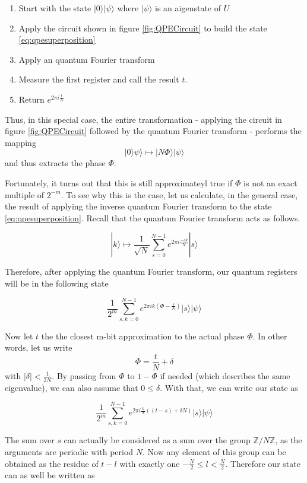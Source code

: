 \documentclass[a4paper, draft]{article}
\theoremstyle{own}
\theoremstyle{remark}
\newcommand{\Z}{\mathbb{Z}}
\begin{document}
\begin{enumerate}
	\item Start with the state  $|0 \rangle |\psi \rangle$ where $|\psi \rangle$ is an aigenstate of $U$
	\item Apply the circuit shown in figure \ref{fig:QPECircuit} to build the state \eqref{eq:qpesuperposition}
	\item Apply an  quantum Fourier transform
	\item Measure the first register and call the result $t$. 
	\item Return $e^{2\pi i \frac{t}{N}}$
\end{enumerate}

Thus, in this special case, the entire transformation - applying the circuit in figure \ref{fig:QPECircuit} followed by the quantum Fourier transform - performs the mapping
$$
|0 \rangle \psi \rangle \mapsto | N \Phi \rangle |\psi \rangle
$$
and thus extracts the phase $\Phi$.

Fortunately, it turns out that this is still approximateyl true if $\Phi$ is not an exact multiple of $2^{-m}$. To see why this is the case, let us calculate, in the general case, the result of applying the inverse quantum Fourier transform to the state \eqref{eq:qpesuperposition}. Recall that the  quantum Fourier transform acts as follows.

$$
|k \rangle \mapsto \frac{1}{\sqrt{N}} \sum_{s=0}^{N-1} e^{2\pi i \frac{-sk}{N}} |s \rangle
$$

Therefore, after applying the  quantum Fourier transform, our quantum registers will be in the following state

$$
\frac{1}{2^m} \sum_{s,k=0}^{N-1} e^{2\pi i k(\Phi - \frac{s}{N})} |s \rangle |\psi \rangle
$$

Now let $t$ the the closest m-bit approximation to the actual phase $\Phi$. In other words, let us write
$$
\Phi = \frac{t}{N} + \delta
$$
with $|\delta| < \frac{1}{2N}$. By passing from $\Phi$ to 
$1 - \Phi$ if needed (which describes the same eigenvalue), we can also assume that $0 \leq \delta$. With that, we can write our state as

$$
\frac{1}{2^m} \sum_{s,k=0}^{N-1} e^{2\pi i \frac{k}{N}((t-s) + \delta N)} |s \rangle |\psi \rangle
$$

The sum over $s$ can actually be considered as a sum over the group $\Z / N\Z$, as the arguments are periodic with period $N$. Now any element of this group can be obtained as the residue of $t - l$ with exactly one  $-\frac{N}{2} \leq l < \frac{N}{2}$. Therefore our state can as well be written as
\end{document}
